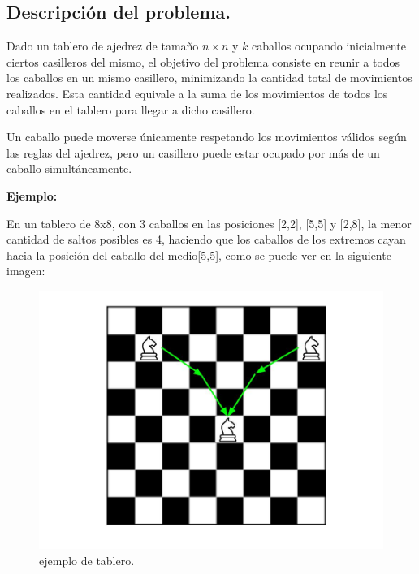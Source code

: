 \subsection{Descripción del problema.}

\vspace*{0.3cm}

Dado un tablero de ajedrez de tamaño $n \times n$ y $k$ caballos ocupando
inicialmente ciertos casilleros del mismo, el objetivo del problema consiste
en reunir a todos los caballos en un mismo casillero, minimizando la
cantidad total de movimientos realizados. Esta cantidad equivale a la suma
de los movimientos de todos los caballos en el tablero para llegar a dicho
casillero.

Un caballo puede moverse únicamente respetando los movimientos válidos según
las reglas del ajedrez, pero un casillero puede estar ocupado por más de un
caballo simultáneamente.

\vspace*{0.5cm}

\textbf{Ejemplo:}

En un tablero de 8x8, con 3 caballos en las posiciones [2,2], [5,5] y [2,8],
la menor cantidad de saltos posibles es 4, haciendo que los caballos de los
extremos cayan hacia la posición del caballo del medio[5,5], como se puede ver
en la siguiente imagen:

\begin{figure}[htb]
  \begin{center}
      \includegraphics[scale=0.25]{imagenes/caballos.jpg}
  \end{center}
  \caption{ejemplo de tablero.}
\end{figure}


